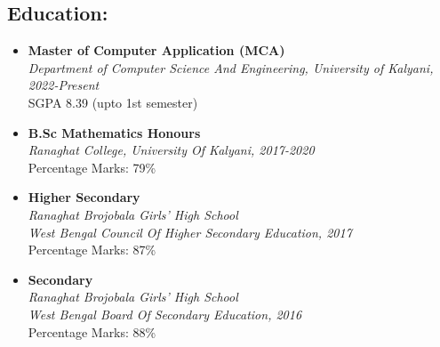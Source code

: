 \documentclass[a4paper, 11pt]{article}
\begin{document}
\begin{tcolorbox}
\begin{minipage}[t]{10cm}
\begin{tcolorbox}[grow to right by=0.5cm, colframe=white, colback=white]
                \section*{Education:}
                    \begin{itemize}
                        \item {
                            \textbf{Master of Computer Application (MCA)} \\
                            \emph{Department of Computer Science And Engineering, University of Kalyani, 2022-Present} \\
                            SGPA 8.39 (upto 1st semester)
                        }
                        \item {
                            \textbf{B.Sc Mathematics Honours}\\
                            \emph{Ranaghat College, University Of Kalyani, 2017-2020}\\
                            Percentage Marks: 79\%
                        }
                        \item {
                            \textbf{Higher Secondary}\\
                            \emph{Ranaghat Brojobala Girls' High School}\\
                            \emph{West Bengal Council Of Higher Secondary Education, 2017}\\
                            Percentage Marks: 87\%
                        }
                        \item {
                            \textbf{Secondary}\\
                            \emph{Ranaghat Brojobala Girls' High School}\\
                            \emph{West Bengal Board Of Secondary Education, 2016}\\
                            Percentage Marks: 88\%
                        }    
                    \end{itemize}
                    

\end{tcolorbox}
\end{minipage}
\end{tcolorbox}
\end{document}
